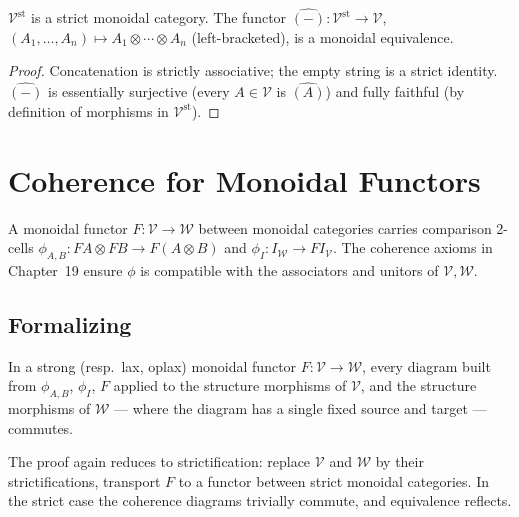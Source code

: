 \begin{proposition}
$\mathcal{V}^{\mathrm{st}}$ is a strict monoidal category. The functor
$\widehat{(-)} : \mathcal{V}^{\mathrm{st}} \to \mathcal{V}$, $(A_1, \ldots,
A_n) \mapsto A_1 \otimes \cdots \otimes A_n$ (left-bracketed), is a monoidal
equivalence.
\end{proposition}

\begin{proof}
Concatenation is strictly associative; the empty string is a strict identity.
$\widehat{(-)}$ is essentially surjective (every $A \in \mathcal{V}$ is
$\widehat{(A)}$) and fully faithful (by definition of morphisms in
$\mathcal{V}^{\mathrm{st}}$).
\end{proof}


\section{Coherence for Monoidal Functors}
\label{sec:monfun-coherence}

A monoidal functor $F : \mathcal{V} \to \mathcal{W}$ between monoidal
categories carries comparison 2-cells $\phi_{A,B} : F A \otimes F B \to
F(A \otimes B)$ and $\phi_I : I_\mathcal{W} \to F I_\mathcal{V}$. The
coherence axioms in Chapter~19 ensure $\phi$ is compatible with the
associators and unitors of $\mathcal{V}, \mathcal{W}$.

\subsection{Formalizing}

\begin{theorem}
\label{thm:monfun-coherence}
In a strong (resp.\ lax, oplax) monoidal functor $F : \mathcal{V} \to
\mathcal{W}$, every diagram built from $\phi_{A,B}$, $\phi_I$, $F$ applied to
the structure morphisms of $\mathcal{V}$, and the structure morphisms of
$\mathcal{W}$ — where the diagram has a single fixed source and target —
commutes.
\end{theorem}

\begin{remark}
The proof again reduces to strictification: replace $\mathcal{V}$ and
$\mathcal{W}$ by their strictifications, transport $F$ to a functor between
strict monoidal categories. In the strict case the coherence diagrams trivially
commute, and equivalence reflects.
\end{remark}

